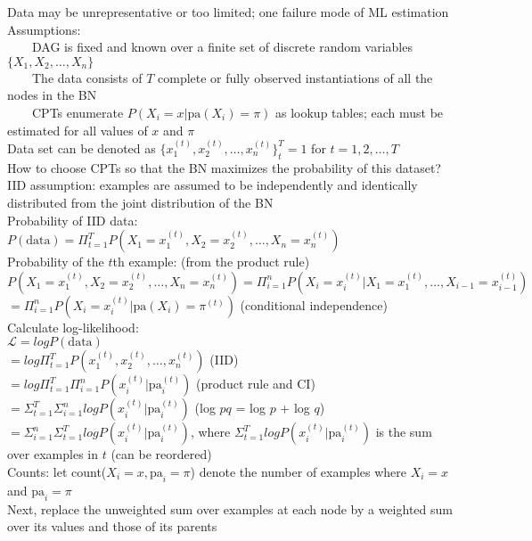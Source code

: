 \documentclass[10pt,letterpaper,unboxed,cm]{article}
\newcommand{\tab}{~~~~}
\begin{document}
Data may be unrepresentative or too limited; one failure mode of ML estimation\\
Assumptions: \\
\tab DAG is fixed and known over a finite set of discrete random variables $\{X_1, X_2, \ldots, X_n\}$\\
\tab The data consists of $T$ complete or fully observed instantiations of all the nodes in the BN\\
\tab CPTs enumerate $P(X_i = x|\text{pa}(X_i) = \pi)$ as lookup tables; each must be estimated for all values of $x$ and $\pi$\\
Data set can be denoted as $\{x_1^{(t)}, x_2^{(t)}, \ldots, x_n^{(t)}\}^T_t = 1$ for $t = 1, 2, \ldots, T$\\
How to choose CPTs so that the BN maximizes the probability of this dataset?\\
IID assumption: examples are assumed to be independently and identically distributed from the joint distribution of the BN\\
Probability of IID data: $P(\text{data}) = \Pi^T_{t = 1} P(X_1 = x_1^{(t)}, X_2 = x_2^{(t)}, \ldots, X_n = x_n^{(t)})$\\
Probability of the $t$th example: (from the product rule)\\
$P(X_1 = x_1^{(t)}, X_2 = x_2^{(t)}, \ldots, X_n = x_n^{(t)}) = \Pi^n_{i = 1} P(X_i = x_i^{(t)}|X_1 = x_1^{(t)}, \ldots, X_{i-1} = x_{i-1}^{(t)})$\\
$ = \Pi^n_{i = 1} P(X_i = x_i^{(t)}|\text{pa}(X_i) = \pi^{(t)})$ (conditional independence)\\
Calculate log-likelihood: \\
$\mathcal{L} = log P(\text{data}) $\\
$= log \Pi^T_{t=1} P(x_1^{(t)}, x_2^{(t)}, \ldots, x_n^{(t)})$ (IID)\\
$= log \Pi^T_{t=1} \Pi^n_{i=1} P(x_i^{(t)}|\text{pa}_i^{(t)})$ (product rule and CI)\\
$= \Sigma^T_{t=1} \Sigma^n_{i=1} log P(x_i^{(t)}|\text{pa}_i^{(t)})$ (log $pq$ = log $p$ + log $q$)\\
$= \Sigma^n_{i=1} \Sigma^T_{t=1} log P(x_i^{(t)}|\text{pa}_i^{(t)})$, where $\Sigma^T_{t=1} log P(x_i^{(t)}|\text{pa}_i^{(t)})$ is the sum over examples in $t$ (can be reordered)\\
Counts: let count($X_i = x, \text{pa}_i = \pi$) denote the number of examples where $X_i = x$ and $\text{pa}_i = \pi$\\
Next, replace the unweighted sum over examples at each node by a weighted sum over its values and those of its parents\\
\end{document}
